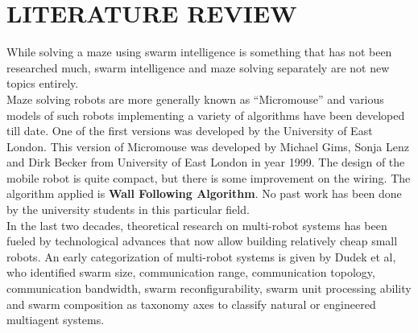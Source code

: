 \section{LITERATURE REVIEW}
While solving a maze using swarm intelligence is something that has not been
researched much, swarm intelligence and maze solving separately are not new topics
entirely.\\
Maze solving robots are more generally known as “Micromouse” and various models
of such robots implementing a variety of algorithms have been developed till date.
One of the first versions was developed by the University of East London. This
version of Micromouse\cite{micromouse} was developed by Michael Gims, Sonja Lenz and Dirk Becker
from University of East London in year 1999. The design of the mobile robot is quite
compact, but there is some improvement on the wiring. The algorithm applied is
\textbf{Wall Following Algorithm}. No past work has been done by the university
students in this particular field.\\
In the last two decades, theoretical research on multi-robot systems has been fueled by technological advances that now allow building relatively cheap small robots. An early categorization of multi-robot systems is given by Dudek et al\cite{second}, who identified swarm size, communication range, communication topology, communication bandwidth, swarm reconfigurability, swarm unit processing ability and swarm composition as taxonomy axes to classify natural or engineered multiagent systems.\cite{third}\\
